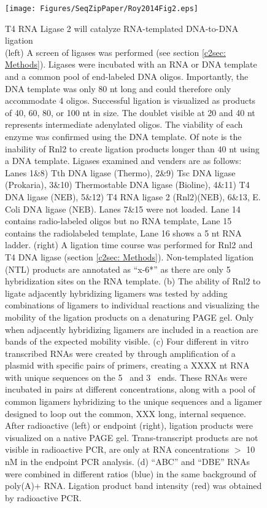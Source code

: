 {		\begin{figure}[htbp] %
			\centering 
			\texttt{[image: Figures/SeqZipPaper/Roy2014Fig2.eps]}
			\caption[T4 RNA Ligase 2 will catalyze RNA-templated DNA-to-DNA ligation]
			{
				T4 RNA Ligase 2 will catalyze RNA-templated DNA-to-DNA ligation \\
				(left) A screen of ligases was performed (see section \ref{c2sec: Methods}). Ligases were incubated with an RNA or DNA template and a common pool of end-labeled DNA oligos. Importantly, the DNA template was only 80 nt long and could therefore only accommodate 4 oligos. Successful ligation is visualized as products of 40, 60, 80, or 100 nt in size. The doublet visible at 20 and 40 nt represents intermediate adenylated oligos. The viability of each enzyme was confirmed using the DNA template. Of note is the inability of Rnl2 to create ligation products longer than 40 nt using a DNA template. Ligases examined and venders are as follows: Lanes 1\&8) Tth DNA ligase (Thermo), 2\&9) Tsc DNA ligase (Prokaria), 3\&10) Thermostable DNA ligase (Bioline), 4\&11) T4 DNA ligase (NEB), 5\&12) T4 RNA ligase 2 (Rnl2)(NEB), 6\&13, E. Coli DNA ligase (NEB). Lanes 7\&15 were not loaded. Lane 14 contains radio-labeled oligos but no RNA template, Lane 15 contains the radiolabeled template, Lane 16 shows a 5 nt RNA ladder.
				(right) A ligation time course was performed for Rnl2 and T4 DNA ligase (section \ref{c2sec: Methods}). Non-templated ligation (NTL) products are annotated as ``x-6*'' as there are only 5 hybridization sites on the RNA template.
				(b) The ability of Rnl2 to ligate adjacently hybridizing ligamers was tested by adding combinations of ligamers to individual reactions and visualizing the mobility of the ligation products on a denaturing PAGE gel. Only when adjacently hybridizing ligamers are included in a reaction are bands of the expected mobility visible. 
				(c) Four different in vitro transcribed RNAs were created by through amplification of a plasmid with specific pairs of primers, creating a 
				XXXX nt RNA with unique sequences on the 5\textprime~ and 3\textprime~ ends. These RNAs were incubated in pairs at different concentrations, along with a pool of common ligamers hybridizing to the unique sequences and a ligamer designed to loop out the common, 
				XXX long, internal sequence. After radioactive (left) or endpoint (right), ligation products were visualized on a native PAGE gel. Trans-transcript products are not visible in radioactive PCR, are only at RNA concentrations $>$ 10 nM in the endpoint PCR analysis.
				(d) ``ABC'' and ``DBE'' RNAs were combined in different ratios (blue) in the same background of poly(A)+ RNA. Ligation product band intensity (red) was obtained by radioactive PCR.
				}
			\label{fig:Roy2014 F2}
			\end{figure}

}
